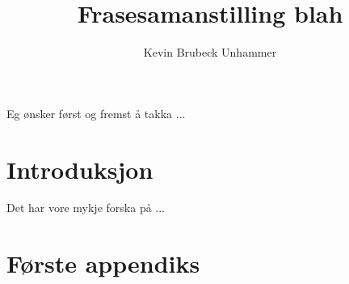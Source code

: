 \documentclass[nynorsk,utf]{uib-mi-master}
\author{Kevin Brubeck Unhammer}
\title{Frasesamanstilling blah}
\begin{document}
 
\makefront 
Eg ønsker først og fremst å takka ... 
\tableofcontents 
\makemain 
\chapter{Introduksjon} 
Det har vore mykje forska på ... 
\appendix 
\chapter{Første appendiks} 
\raggedright 
 
\end{document}
